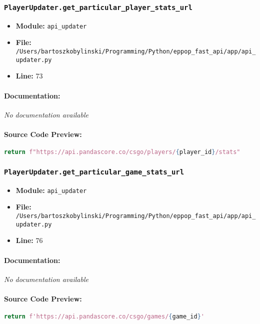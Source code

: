 \documentclass[11pt,a4paper]{article}
\begin{document}
\vspace{1em}
\subsubsection{\texttt{PlayerUpdater.get\_particular\_player\_stats\_url}}

\begin{itemize}
    \item \textbf{Module:} \texttt{api\_updater}
    \item \textbf{File:} \texttt{/Users/bartoszkobylinski/Programming/Python/eppop\_fast\_api/app/api\_updater.py}
    \item \textbf{Line:} 73
\end{itemize}

\paragraph{Documentation:} \textit{No documentation available}

\paragraph{Source Code Preview:}
\begin{lstlisting}[language=Python]
        return f"https://api.pandascore.co/csgo/players/{player_id}/stats"
\end{lstlisting}

\vspace{1em}
\subsubsection{\texttt{PlayerUpdater.get\_particular\_game\_stats\_url}}

\begin{itemize}
    \item \textbf{Module:} \texttt{api\_updater}
    \item \textbf{File:} \texttt{/Users/bartoszkobylinski/Programming/Python/eppop\_fast\_api/app/api\_updater.py}
    \item \textbf{Line:} 76
\end{itemize}

\paragraph{Documentation:} \textit{No documentation available}

\paragraph{Source Code Preview:}
\begin{lstlisting}[language=Python]
        return f'https://api.pandascore.co/csgo/games/{game_id}'
\end{lstlisting}
\end{document}
